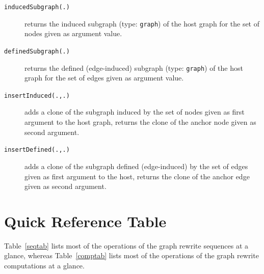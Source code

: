 \begin{description}
\item[\texttt{inducedSubgraph(.)}] returns the induced subgraph (type: \texttt{graph}) of the host graph for the set of nodes given as argument value.
\item[\texttt{definedSubgraph(.)}] returns the defined (edge-induced) subgraph (type: \texttt{graph}) of the host graph for the set of edges given as argument value.
\item[\texttt{insertInduced(.,.)}] adds a clone of the subgraph induced by the set of nodes given as first argument to the host graph, returns the clone of the anchor node given as second argument.
\item[\texttt{insertDefined(.,.)}] adds a clone of the subgraph defined (edge-induced) by the set of edges given as first argument to the host, returns the clone of the anchor edge given as second argument.
\end{description}


\section{Quick Reference Table}

Table~\ref{seqtab} lists most of the operations of the graph rewrite sequences at a glance,
whereas Table~\ref{comptab} lists most of the operations of the graph rewrite computations at a glance.

